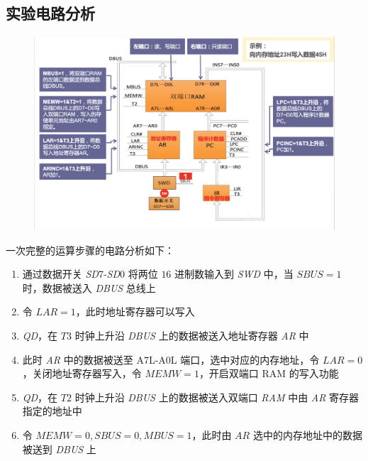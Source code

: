     \subsection{实验电路分析}
        \begin{figure}[htbp]
            \centering
            \includegraphics*[width=12cm]{2_cu.png}
        \end{figure}

        \par 一次完整的运算步骤的电路分析如下：
        \begin{enumerate}
            \item 通过数据开关 \textit{SD}7-\textit{SD}0 将两位 $16$ 进制数输入到 \textit{SWD} 中，当 $SBUS = 1$ 时，数据被送入 \textit{DBUS} 总线上
            \item 令 $LAR = 1$，此时地址寄存器可以写入
            \item \textit{QD}，在 $T3$ 时钟上升沿 \textit{DBUS} 上的数据被送入地址寄存器 \textit{AR} 中
            \item 此时 \textit{AR} 中的数据被送至 A7L-A0L 端口，选中对应的内存地址，令 $LAR=0$，关闭地址寄存器写入，令 $MEMW=1$，开启双端口 RAM 的写入功能
            \item \textit{QD}，在 $T2$ 时钟上升沿 \textit{DBUS} 上的数据被送入双端口 \textit{RAM} 中由 \textit{AR} 寄存器指定的地址中
            \item 令 $MEMW=0, SBUS=0, MBUS=1$，此时由 $AR$ 选中的内存地址中的数据被送到 \textit{DBUS} 上
        \end{enumerate}

